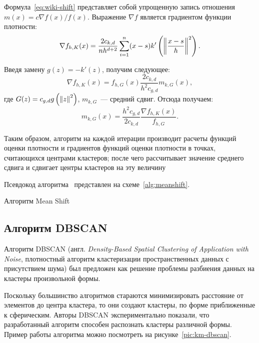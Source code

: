 Формула~\eqref{eq:wiki-shift} представляет собой упрощенную запись отношения\linebreak \( m(x) = c\nabla f(x) / f(x) \). Выражение \( \nabla f \) является градиентом функции плотности:
\[
    \nabla f_{h, K}(x) = \frac{2c_{k, d}}{nh^{d+2}}\sum_{i=1}^n (x - s)k'\left(\left\|\frac{x - s}{h}\right\|^2\right).
\]

Введя замену \( g(z) = -k'(z) \), получим следующее:
\[
    \nabla f_{h, K}(x) = f_{h, G}(x)\frac{2c_{k, d}}{h^2c_{g, d}}m_{k, G}(x),
\]
где \( G(z) = c_{g, d} g\left(\left\|z\right\|^2\right) \), \( m_{k, G} \)~--- средний сдвиг. Отсюда получаем:
\begin{equation}
    m_{k, G}(x) = \frac{h^2c_{g, d}}{2c_{k, d}}\frac{\nabla f_{h, K}(x)}{f_{h, G}}.
    \label{eq:themeanshift}
\end{equation}

Таким образом, алгоритм на каждой итерации производит расчеты функций оценки плотности и градиентов функций оценки плотности в точках, считающихся центрами кластеров; после чего рассчитывает значение среднего сдвига и сдвигает центры кластеров на эту величину

Псевдокод алгоритма~\cite[с. 235-236]{algms} представлен на схеме~\ref{alg:meanshift}.
\begin{algorithm}[ht!]
    \caption{Алгоритм Mean Shift}
    \label{alg:meanshift}
\end{algorithm}

\subsection{Алгоритм DBSCAN} \label{sec:dbscan}
Алгоритм DBSCAN (англ. \emph{Density-Based Spatial Clustering of Application with Noise}, плотностный алгоритм кластеризации пространственных данных с присутствием шума) был предложен как решение проблемы разбиения данных на кластеры произвольной формы.

Поскольку большинство алгоритмов стараются минимизировать расстояние от элементов до центра кластера, то они создают кластеры, по форме приближенные к сферическим. Авторы DBSCAN экспериментально показали, что разработанный алгоритм способен распознать кластеры различной формы. Пример работы алгоритма можно посмотреть на рисунке~\ref{pic:km-dbscan}.


